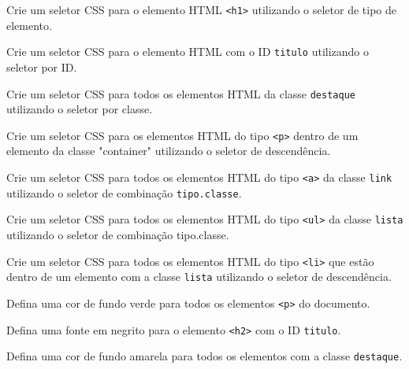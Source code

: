 \begin{exercise}
Crie um seletor CSS para o elemento HTML \texttt{<h1>} utilizando o seletor de tipo de elemento.
\end{exercise}

\begin{exercise}
Crie um seletor CSS para o elemento HTML com o ID \texttt{titulo} utilizando o seletor por ID.
\end{exercise}

\begin{exercise}
Crie um seletor CSS para todos os elementos HTML da classe \texttt{destaque} utilizando o seletor por classe.
\end{exercise}

\begin{exercise}
Crie um seletor CSS para os elementos HTML do tipo \texttt{<p>} dentro de um elemento da classe "container" utilizando o seletor de descendência.
\end{exercise}

\begin{exercise}
Crie um seletor CSS para todos os elementos HTML do tipo \texttt{<a>} da classe \texttt{link} utilizando o seletor de combinação \texttt{tipo.classe}.
\end{exercise}

\begin{exercise}
Crie um seletor CSS para todos os elementos HTML do tipo \texttt{<ul>} da classe \texttt{lista} utilizando o seletor de combinação tipo.classe.
\end{exercise}

\begin{exercise}
Crie um seletor CSS para todos os elementos HTML do tipo \texttt{<li>} que estão dentro de um elemento com a classe \texttt{lista} utilizando o seletor de descendência.
\end{exercise}

\begin{exercise}
Defina uma cor de fundo verde para todos os elementos \texttt{<p>} do documento.
\end{exercise}

\begin{exercise}
Defina uma fonte em negrito para o elemento \texttt{<h2>} com o ID \texttt{titulo}.
\end{exercise}

\begin{exercise}
Defina uma cor de fundo amarela para todos os elementos com a classe \texttt{destaque}.
\end{exercise}

